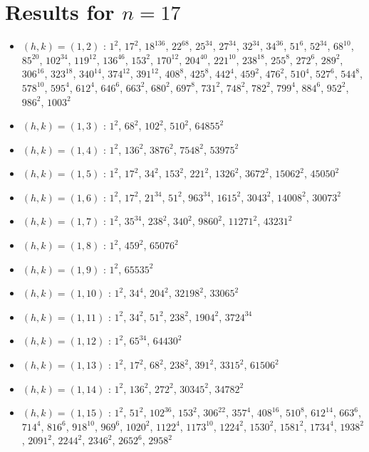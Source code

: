 \section{Results for $n=17$}
\begin{itemize}
\item $(h,k)=(1,2)$ : $1^{2}$, $17^{2}$, $18^{136}$, $22^{68}$, $25^{34}$, $27^{34}$, $32^{34}$, $34^{36}$, $51^{6}$, $52^{34}$, $68^{10}$, $85^{20}$, $102^{34}$, $119^{12}$, $136^{46}$, $153^{2}$, $170^{12}$, $204^{40}$, $221^{10}$, $238^{18}$, $255^{8}$, $272^{6}$, $289^{2}$, $306^{16}$, $323^{18}$, $340^{14}$, $374^{12}$, $391^{12}$, $408^{8}$, $425^{8}$, $442^{4}$, $459^{2}$, $476^{2}$, $510^{4}$, $527^{6}$, $544^{8}$, $578^{10}$, $595^{4}$, $612^{4}$, $646^{6}$, $663^{2}$, $680^{2}$, $697^{8}$, $731^{2}$, $748^{2}$, $782^{2}$, $799^{4}$, $884^{6}$, $952^{2}$, $986^{2}$, $1003^{2}$
\item $(h,k)=(1,3)$ : $1^{2}$, $68^{2}$, $102^{2}$, $510^{2}$, $64855^{2}$
\item $(h,k)=(1,4)$ : $1^{2}$, $136^{2}$, $3876^{2}$, $7548^{2}$, $53975^{2}$
\item $(h,k)=(1,5)$ : $1^{2}$, $17^{2}$, $34^{2}$, $153^{2}$, $221^{2}$, $1326^{2}$, $3672^{2}$, $15062^{2}$, $45050^{2}$
\item $(h,k)=(1,6)$ : $1^{2}$, $17^{2}$, $21^{34}$, $51^{2}$, $963^{34}$, $1615^{2}$, $3043^{2}$, $14008^{2}$, $30073^{2}$
\item $(h,k)=(1,7)$ : $1^{2}$, $35^{34}$, $238^{2}$, $340^{2}$, $9860^{2}$, $11271^{2}$, $43231^{2}$
\item $(h,k)=(1,8)$ : $1^{2}$, $459^{2}$, $65076^{2}$
\item $(h,k)=(1,9)$ : $1^{2}$, $65535^{2}$
\item $(h,k)=(1,10)$ : $1^{2}$, $34^{4}$, $204^{2}$, $32198^{2}$, $33065^{2}$
\item $(h,k)=(1,11)$ : $1^{2}$, $34^{2}$, $51^{2}$, $238^{2}$, $1904^{2}$, $3724^{34}$
\item $(h,k)=(1,12)$ : $1^{2}$, $65^{34}$, $64430^{2}$
\item $(h,k)=(1,13)$ : $1^{2}$, $17^{2}$, $68^{2}$, $238^{2}$, $391^{2}$, $3315^{2}$, $61506^{2}$
\item $(h,k)=(1,14)$ : $1^{2}$, $136^{2}$, $272^{2}$, $30345^{2}$, $34782^{2}$
\item $(h,k)=(1,15)$ : $1^{2}$, $51^{2}$, $102^{36}$, $153^{2}$, $306^{22}$, $357^{4}$, $408^{16}$, $510^{8}$, $612^{14}$, $663^{6}$, $714^{4}$, $816^{6}$, $918^{10}$, $969^{6}$, $1020^{2}$, $1122^{4}$, $1173^{10}$, $1224^{2}$, $1530^{2}$, $1581^{2}$, $1734^{4}$, $1938^{2}$, $2091^{2}$, $2244^{2}$, $2346^{2}$, $2652^{6}$, $2958^{2}$

\end{itemize}
